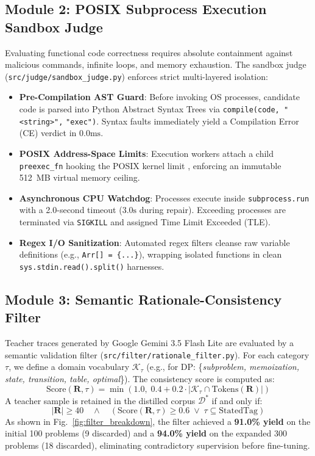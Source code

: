 \documentclass{ieeeaccess}
\begin{document}
\subsection{Module 2: POSIX Subprocess Execution Sandbox Judge}
Evaluating functional code correctness requires absolute containment against malicious commands, infinite loops, and memory exhaustion. The sandbox judge (\texttt{src/judge/sandbox\_judge.py}) enforces strict multi-layered isolation:
\begin{itemize}
    \item \textbf{Pre-Compilation AST Guard}: Before invoking OS processes, candidate code is parsed into Python Abstract Syntax Trees via \texttt{compile(code, "<string>",} \texttt{"exec")}. Syntax faults immediately yield a Compilation Error (CE) verdict in $0.0\text{ms}$.
    \item \textbf{POSIX Address-Space Limits}: Execution workers attach a child \texttt{preexec\_fn} hooking the POSIX kernel limit \allowbreak{}\allowbreak{}, enforcing an immutable 512~MB virtual memory ceiling.
    \item \textbf{Asynchronous CPU Watchdog}: Processes execute inside \texttt{subprocess.run} with a 2.0-second timeout ($3.0\text{s}$ during repair). Exceeding processes are terminated via \texttt{SIGKILL} and assigned Time Limit Exceeded (TLE).
    \item \textbf{Regex I/O Sanitization}: Automated regex filters cleanse raw variable definitions (e.g., \texttt{Arr[] = \{...\}}), wrapping isolated functions in clean \texttt{sys.stdin.read().split()} harnesses.
\end{itemize}

\subsection{Module 3: Semantic Rationale-Consistency Filter}
Teacher traces generated by Google Gemini 3.5 Flash Lite are evaluated by a semantic validation filter (\texttt{src/filter/rationale\_filter.py}). For each category $\tau$, we define a domain vocabulary $\mathcal{K}_\tau$ (e.g., for DP: \{\textit{subproblem, memoization, state, transition, table, optimal}\}). The consistency score is computed as:
\begin{equation}
\label{eq:filter_score}
\text{Score}(\mathbf{R}, \tau) = \min\left(1.0,\; 0.4 + 0.2 \cdot |\mathcal{K}_\tau \cap \text{Tokens}(\mathbf{R})|\right)
\end{equation}
A teacher sample is retained in the distilled corpus $\mathcal{D}^*$ if and only if:
\begin{equation}
|\mathbf{R}| \ge 40 \quad \land \quad \left(\text{Score}(\mathbf{R}, \tau) \ge 0.6 \;\lor\; \tau \subseteq \text{StatedTag}\right)
\end{equation}
As shown in Fig.~\ref{fig:filter_breakdown}, the filter achieved a \textbf{91.0\% yield} on the initial 100 problems (9 discarded) and a \textbf{94.0\% yield} on the expanded 300 problems (18 discarded), eliminating contradictory supervision before fine-tuning.
\end{document}
